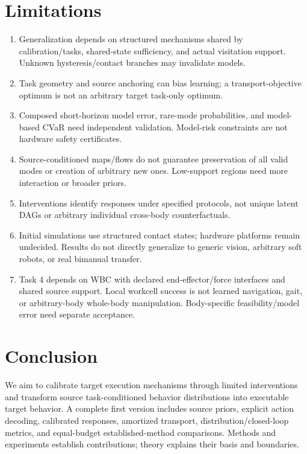 \documentclass[11pt]{article}
\begin{document}
\section{Limitations}
\begin{enumerate}
\item Generalization depends on structured mechanisms shared by calibration/tasks, shared-state sufficiency, and actual visitation support. Unknown hysteresis/contact branches may invalidate models.
\item Task geometry and source anchoring can bias learning; a transport-objective optimum is not an arbitrary target task-only optimum.
\item Composed short-horizon model error, rare-mode probabilities, and model-based CVaR need independent validation. Model-risk constraints are not hardware safety certificates.
\item Source-conditioned maps/flows do not guarantee preservation of all valid modes or creation of arbitrary new ones. Low-support regions need more interaction or broader priors.
\item Interventions identify responses under specified protocols, not unique latent DAGs or arbitrary individual cross-body counterfactuals.
\item Initial simulations use structured contact states; hardware platforms remain undecided. Results do not directly generalize to generic vision, arbitrary soft robots, or real bimanual transfer.
\item Task 4 depends on WBC with declared end-effector/force interfaces and shared source support. Local workcell success is not learned navigation, gait, or arbitrary-body whole-body manipulation. Body-specific feasibility/model error need separate acceptance.
\end{enumerate}

\section{Conclusion}
We aim to calibrate target execution mechanisms through limited interventions and
transform source task-conditioned behavior distributions into executable target
behavior. A complete first version includes source priors, explicit action decoding,
calibrated responses, amortized transport, distribution/closed-loop metrics, and
equal-budget established-method comparisons. Methods and experiments establish
contributions; theory explains their basis and boundaries.
\end{document}
